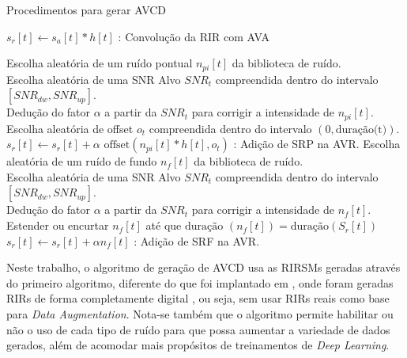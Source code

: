 \begin{algorithm} [H] 
    \caption{Procedimentos para gerar AVCD}
    \label{alg:AVCD-gen}


    $s_r[t] \gets s_a[t] \ast h[t]$ : Convolução da RIR com AVA

    {
        {
            Escolha aleatória de um ruído pontual $n_{pi}[t]$ da biblioteca de ruído. \\
            Escolha aleatória de uma SNR Alvo $SNR_t$ compreendida dentro do intervalo $[SNR_{dw},SNR_{up}]$. \\
            Dedução do fator $\alpha$ a partir da $SNR_t$ para corrigir a intensidade de $n_{pi}[t]$. \\
            Escolha aleatória de offset $o_t$ compreendida dentro do intervalo $(0,\text{duração(t)})$. \\
            $s_r[t] \gets s_r[t] + \alpha \text{ offset}(n_{pi}[t] \ast h[t], o_t)$ : Adição de SRP na AVR.
        }
    }
    {
        Escolha aleatória de um ruído de fundo $n_f[t]$ da biblioteca de ruído. \\
        Escolha aleatória de uma SNR Alvo $SNR_t$ compreendida dentro do intervalo $[SNR_{dw},SNR_{up}]$. \\
        Dedução do fator $\alpha$ a partir da $SNR_t$ para corrigir a intensidade de $n_f[t]$. \\
        Estender ou encurtar $n_f[t]$ até que $\text{duração }(n_f[t]) = \text{duração}(S_r[t])$
        $s_r[t] \gets s_r[t] + \alpha n_f[t]$ : Adição de SRF na AVR.
    }

\end{algorithm}
\pagebreak


Neste trabalho, o algoritmo de geração de AVCD usa as RIRSMs geradas através do primeiro algoritmo, diferente do que foi implantado
em \cite{Speech_Rec}, onde foram geradas RIRs de forma completamente digital \cite{RIR_sim_image}, ou seja, sem usar RIRs reais 
como base para \textit{Data Augmentation}.
Nota-se também que o algoritmo permite habilitar ou não o uso de cada tipo de ruído para que possa aumentar a variedade de dados gerados, além
de acomodar mais propósitos de treinamentos de \textit{Deep Learning}.

